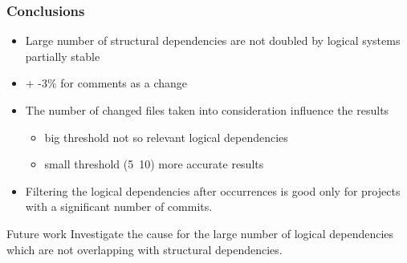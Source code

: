 \documentclass{beamer}
\begin{document}
 \begin{frame}
\frametitle{Conclusions}
 \begin{itemize}
        \item  Large number of structural dependencies are not doubled by logical \MVRightarrow{} systems partially stable
        \item  + -3\% for comments as a change
        \item The number of changed files taken into consideration influence the results
	\begin{itemize}   
	\item big threshold  \MVRightarrow{} not so relevant logical dependencies
	\item small threshold (5~10)  \MVRightarrow{} more accurate results
    	\end{itemize}
      \item Filtering the logical dependencies after occurrences is good only for projects with a significant number of commits. 
    \end{itemize}
\begin{block}{Future work}
Investigate the cause for the large number of logical dependencies which are not overlapping with structural dependencies.
\end{block}
\end{frame}

\end{document}
